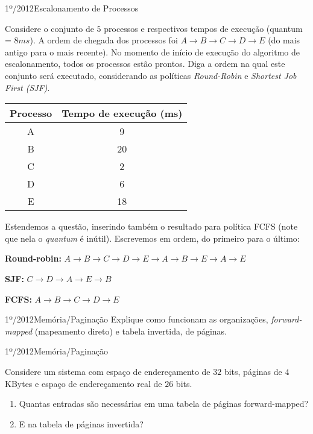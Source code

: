 \begin{exercicio}
  {1º/2012}{Escalonamento de Processos}
  {Considere o conjunto de $5$ processos e respectivos tempos de execução (quantum = $8 ms$). A ordem de chegada dos processos foi $A \rightarrow B \rightarrow C \rightarrow D \rightarrow E$ (do mais antigo para o mais recente). No momento de início de execução do algoritmo de escalonamento, todos os processos estão prontos. Diga a ordem na qual este conjunto será executado, considerando as políticas \textit{Round-Robin} e \textit{Shortest Job First (SJF)}.
  \begin{table}[h]
      \centering
      \begin{tabular}{cc}
        \hline \hline
        \textbf{Processo} & \textbf{Tempo de execução (ms)} \\ \hline
        A                 & 9                               \\
        B                 & 20                              \\
        C                 & 2                               \\
        D                 & 6                               \\
        E                 & 18                              \\
        \hline \hline
      \end{tabular}
    \end{table}
  }


    Estendemos a questão, inserindo também o resultado para política FCFS (note que nela o \textit{quantum} é inútil). Escrevemos em ordem, do primeiro para o último:

    \textbf{Round-robin:} $A \rightarrow B \rightarrow C \rightarrow D \rightarrow E \rightarrow A \rightarrow B \rightarrow E \rightarrow A \rightarrow E$

    \textbf{SJF:} $C \rightarrow D \rightarrow A \rightarrow E \rightarrow B$

    \textbf{FCFS:} $A \rightarrow B \rightarrow C \rightarrow D \rightarrow E$
\end{exercicio}

\begin{exercicio}
  {1º/2012}{Memória/Paginação}
  {Explique como funcionam as organizações, \textit{forward-mapped} (mapeamento direto) e tabela invertida, de páginas.}
\end{exercicio}

\begin{exercicio}
  {1º/2012}{Memória/Paginação}
  {Considere um sistema com espaço de endereçamento de $32$ bits, páginas de $4$ KBytes e espaço de endereçamento real de $26$ bits.
  \begin{enumerate}[label=(\alph*)]
    \item Quantas entradas são necessárias em uma tabela de páginas forward-mapped?
    \item E na tabela de páginas invertida?
  \end{enumerate}}
\end{exercicio}

